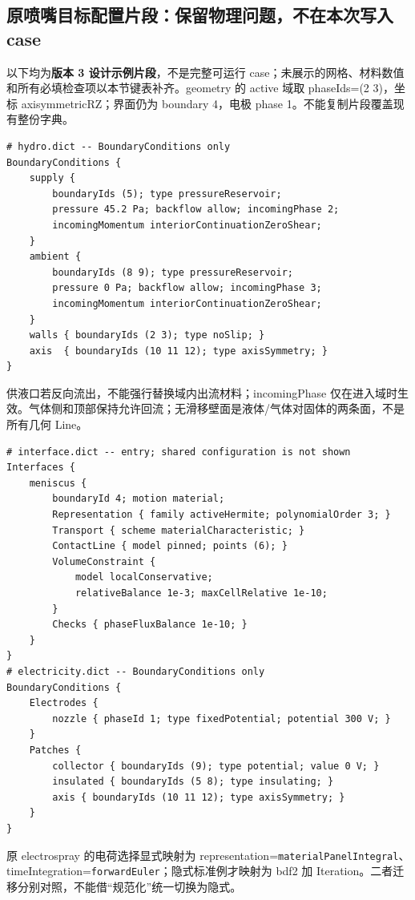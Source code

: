 \documentclass[UTF8,a4paper,11pt,fontset=fandol]{ctexart}
\numberwithin{equation}{section}
\newcommand{\code}[1]{\nolinkurl{#1}}
\begin{document}
\subsection{原喷嘴目标配置片段：保留物理问题，不在本次写入 case}
以下均为\textbf{版本 3 设计示例片段}，不是完整可运行 case；未展示的网格、材料数值和所有必填检查项以本节键表补齐。geometry 的 active 域取 phaseIds=(2 3)，坐标 axisymmetricRZ；界面仍为 boundary 4，电极 phase 1。不能复制片段覆盖现有整份字典。
\par\noindent\begin{minipage}{\textwidth}\footnotesize\begin{verbatim}
# hydro.dict -- BoundaryConditions only
BoundaryConditions {
    supply {
        boundaryIds (5); type pressureReservoir;
        pressure 45.2 Pa; backflow allow; incomingPhase 2;
        incomingMomentum interiorContinuationZeroShear;
    }
    ambient {
        boundaryIds (8 9); type pressureReservoir;
        pressure 0 Pa; backflow allow; incomingPhase 3;
        incomingMomentum interiorContinuationZeroShear;
    }
    walls { boundaryIds (2 3); type noSlip; }
    axis  { boundaryIds (10 11 12); type axisSymmetry; }
}
\end{verbatim}\end{minipage}\par
供液口若反向流出，不能强行替换域内出流材料；incomingPhase 仅在进入域时生效。气体侧和顶部保持允许回流；无滑移壁面是液体/气体对固体的两条面，不是所有几何 Line。
\par\noindent\begin{minipage}{\textwidth}\footnotesize\begin{verbatim}
# interface.dict -- entry; shared configuration is not shown
Interfaces {
    meniscus {
        boundaryId 4; motion material;
        Representation { family activeHermite; polynomialOrder 3; }
        Transport { scheme materialCharacteristic; }
        ContactLine { model pinned; points (6); }
        VolumeConstraint {
            model localConservative;
            relativeBalance 1e-3; maxCellRelative 1e-10;
        }
        Checks { phaseFluxBalance 1e-10; }
    }
}
# electricity.dict -- BoundaryConditions only
BoundaryConditions {
    Electrodes {
        nozzle { phaseId 1; type fixedPotential; potential 300 V; }
    }
    Patches {
        collector { boundaryIds (9); type potential; value 0 V; }
        insulated { boundaryIds (5 8); type insulating; }
        axis { boundaryIds (10 11 12); type axisSymmetry; }
    }
}
\end{verbatim}\end{minipage}\par
原 electrospray 的电荷选择显式映射为 representation=\code{materialPanelIntegral}、timeIntegration=\code{forwardEuler}；隐式标准例才映射为 bdf2 加 Iteration。二者迁移分别对照，不能借“规范化”统一切换为隐式。
\end{document}
